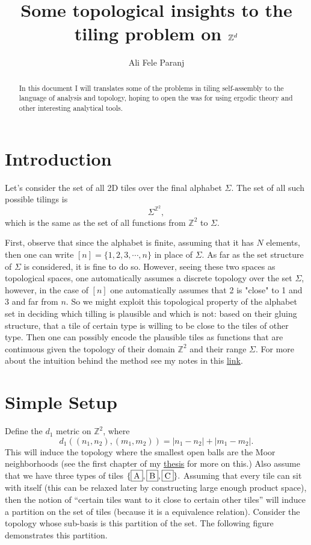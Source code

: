 \documentclass[11pt,a4paper]{article}
\title{Some topological insights to the tiling problem on $ \Z^d $}
\author{Ali Fele Paranj}
\newcommand{\Z}{\mathbb{Z}}
\newcommand{\tile}[1]{\fbox{{#1}}}
\theoremstyle{definition}
\theoremstyle{remark}
\theoremstyle{definition}
\begin{document}
	
	\maketitle
	\begin{abstract}
		In this document I will translates some of the problems in tiling self-assembly to the language of analysis and topology, hoping to open the was for using ergodic theory and other interesting analytical tools. 
	\end{abstract}
	
	
	\section{Introduction}
	
	Let's consider the set of all 2D tiles over the final alphabet $\Sigma$. The set of all such possible tilings is 
	$$ \Sigma^{\mathbb{Z}^2}, $$
	which is the same as the set of all functions from $\mathbb{Z}^2$ to $\Sigma$. 
	
	First, observe that since the alphabet is finite, assuming that it has $N$ elements, then one can write $[n] = \{1,2,3,\cdots,n\}$ in place of $\Sigma$. As far as the set structure of $\Sigma$ is considered, it is fine to do so. However, seeing these two spaces as topological spaces, one automatically assumes a discrete topology over the set $\Sigma$, however, in the case of $[n]$ one automatically assumes that 2 is "close" to 1 and 3 and far from $n$. So we might exploit this topological property of the alphabet set in deciding which tilling is plausible and which is not: based on their gluing structure, that a tile of certain type is willing to be close to the tiles of other type. Then one can possibly encode the plausible tiles as functions that are continuous given the topology of their domain $\mathbb{Z}^2$ and their range $\Sigma$. For more about the intuition behind the method see my notes in this \href{https://github.com/alifele/Lecture-Notes/blob/main/Scientific%20Notes/Some%20Intuitions%20on%20Continuous%20Maps/GraphHomologyAndCohomology.pdf}{link}.
	
	
	\section{Simple Setup}
	Define the $ d_1 $ metric on $ \Z^2 $, where
	\[ d_1\left( (n_1,n_2), (m_1,m_2) \right) = |n_1-n_2| + |m_1-m_2|. \]
	This will induce the topology where the smallest open balls are the Moor neighborhoods (see the first chapter of my \href{https://open.library.ubc.ca/soa/cIRcle/collections/ubctheses/24/items/1.0449873}{thesis} for more on this.) Also assume that we have three types of tiles $ \{ \tile{A}, \tile{B}, \tile{C} \}. $ Assuming that every tile can sit with itself (this can be relaxed later by constructing large enough product space), then the notion of ``certain tiles want to it close to certain other tiles'' will induce a partition on the set of tiles (because it is a equivalence relation). Consider the topology whose sub-basis is this partition of the set. The following figure demonstrates this partition.
	
\end{document}
